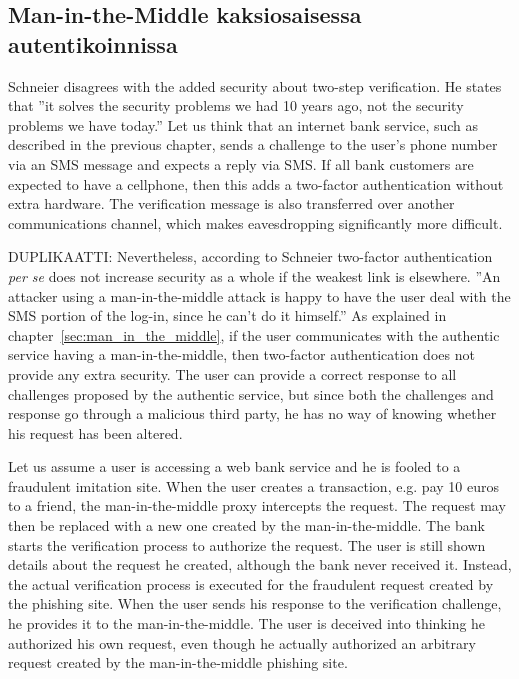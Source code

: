 \documentclass[english,gradu]{tktltiki}
\begin{document}


\subsection{Man-in-the-Middle kaksiosaisessa autentikoinnissa} %
\label{sub:man_in_the_middle_kaksiosaisessa_autentikoinnissa}


            Schneier \cite{schneier_2factor_2005} disagrees with the added security about two-step verification. He states that ''it solves the security problems we had 10 years ago, not the security problems we have today.'' Let us think that an internet bank service, such as described in the previous chapter, sends a challenge to the user's phone number via an SMS message and expects a reply via SMS. If all bank customers are expected to have a cellphone, then this adds a two-factor authentication without extra hardware. The verification message is also transferred over another communications channel, which makes eavesdropping significantly more difficult.

             DUPLIKAATTI:
             Nevertheless, according to Schneier \cite{schneier_2factor_2005} two-factor authentication \emph{per se} does not increase security as a whole if the weakest link is elsewhere. ''An attacker using a man-in-the-middle attack is happy to have the user deal with the SMS portion of the log-in, since he can’t do it himself.'' \cite{schneier_2factor_2005} As explained in chapter~\ref{sec:man_in_the_middle}, if the user communicates with the authentic service having a man-in-the-middle, then two-factor authentication does not provide any extra security. The user can provide a correct response to all challenges proposed by the authentic service, but since both the challenges and response go through a malicious third party, he has no way of knowing whether his request has been altered.

             Let us assume a user is accessing a web bank service and he is fooled to a fraudulent imitation site. When the user creates a transaction, e.g. pay 10 euros to a friend, the man-in-the-middle proxy intercepts the request. The request may then be replaced with a new one created by the man-in-the-middle. The bank starts the verification process to authorize the request. The user is still shown details about the request he created, although the bank never received it. Instead, the actual verification process is executed for the fraudulent request created by the phishing site. When the user sends his response to the verification challenge, he provides it to the man-in-the-middle. The user is deceived into thinking he authorized his own request, even though he actually authorized an arbitrary request created by the man-in-the-middle phishing site.
\end{document}
